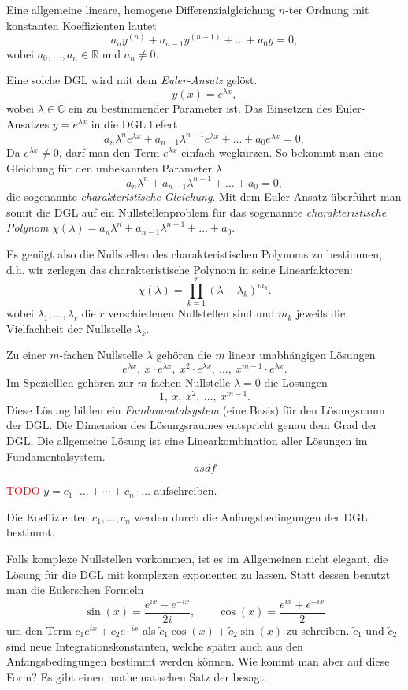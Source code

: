 \documentclass[a4paper,landscape,8pt]{extarticle}
\newcommand{\R}{\mathbb{R}}
\newcommand{\C}{\mathbb{C}}
\newcommand{\todo}{\textcolor{red}{TODO }}
\begin{document}
\begin{multicols*}{4}
\Def Eine allgemeine lineare, homogene Differenzialgleichung $n$-ter Ordnung mit
konstanten Koeffizienten lautet
\[
a_ny^{(n)} + a_{n-1}y^{(n-1)} + \ldots + a_0 y = 0,
\]
wobei $a_0, \ldots, a_n\in \R$ und $a_n\neq 0$.

\begin{warmup}
\Vorgehen Eine solche DGL wird mit dem \emph{Euler-Ansatz} gelöst.
\[
y(x) = e^{\lambda x},
\]
wobei $\lambda \in \C$ ein zu bestimmender Parameter ist. Das Einsetzen des
Euler-Ansatzes $y=e^{\lambda x}$ in die DGL liefert
\[
a_n\lambda^{n}e^{\lambda x} + a_{n-1}\lambda^{n-1}e^{\lambda x} + \ldots +
a_0 e^{\lambda x} = 0,
\]
Da $e^{\lambda x}\neq 0$, darf man den Term $e^{\lambda x}$ einfach wegkürzen.
So bekommt man eine Gleichung für den unbekannten Parameter $\lambda$
\[
a_n\lambda^{n} + a_{n-1}\lambda^{n-1} + \ldots + a_0 = 0,
\]
die sogenannte \emph{charakteristische Gleichung}. Mit dem Euler-Ansatz
überführt man somit die DGL auf ein Nullstellenproblem für das sogenannte
\emph{charakteristische Polynom} $\chi(\lambda) = a_n\lambda^{n} +
a_{n-1}\lambda^{n-1} + \ldots + a_0$.

Es genügt also die Nullstellen des charakteristischen Polynoms zu bestimmen,
d.h. wir zerlegen das charakteristische Polynom in seine Linearfaktoren:
\[
\chi(\lambda) = \prod_{k=1}^{r} (\lambda - \lambda_k)^{m_k}.
\]
wobei $\lambda_1,\ldots,\lambda_r$ die $r$ verschiedenen Nullstellen sind und
$m_k$ jeweils die Vielfachheit der Nullstelle $\lambda_k$.

Zu einer $m$-fachen Nullstelle $\lambda$ gehören die $m$ linear unabhängigen
Lösungen
\[
e^{\lambda x},\ x\cdot e^{\lambda x},\ x^2\cdot e^{\lambda x},\ \ldots,\
x^{m-1}\cdot e^{\lambda x}.
\]
Im Spezielllen gehören zur $m$-fachen Nullstelle $\lambda = 0$ die Lösungen 
\[
1,\ x, \ x^2,\ \ldots,\ x^{m-1}.
\]
Diese Lösung bilden ein \emph{Fundamentalsystem} (eine Basis) für den
Lösungsraum der DGL. Die Dimension des Lösungsraumes entspricht genau dem Grad
der DGL. Die allgemeine Lösung ist eine Linearkombination aller Lösungen im
Fundamentalsystem.
\[
asdf
\]

\todo $y=c_1 \cdot \ldots + \cdots + c_n \cdot \ldots$ aufschreiben.

Die Koeffizienten $c_1,\ldots,c_n$ werden durch die Anfangsbedingungen der DGL
bestimmt.

Falls komplexe Nullstellen vorkommen, ist es im Allgemeinen nicht elegant, die
Lösung für die DGL mit komplexen exponenten zu lassen. Statt dessen benutzt man
die Eulerschen Formeln
\[
\sin(x) = \frac{e^{ix}-e^{-ix}}{2i}, \qquad
\cos(x) = \frac{e^{ix}+e^{-ix}}{2}
\]
um den Term $c_1e^{ix}+c_2e^{-ix}$ als $\widetilde{c}_1\cos(x) +
\widetilde{c}_2\sin(x)$ zu schreiben. $\widetilde{c}_1$ und $\widetilde{c}_2$
sind neue Integrationskonstanten, welche später auch aus den Anfangsbedingungen
bestimmt werden können. Wie kommt man aber auf diese Form? Es gibt einen
mathematischen Satz der besagt:


\end{warmup}
\end{multicols*}
\end{document}
